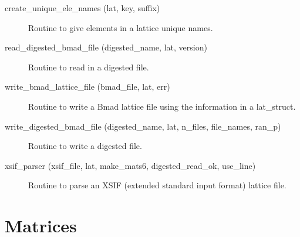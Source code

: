 \begin{description}
\label{r:create.unique.ele.names}
\item[create_unique_ele_names (lat, key, suffix)] \Newline 
Routine to give elements in a lattice unique names.

\label{r:read.digested.bmad.file}
\item[read_digested_bmad_file (digested_name, lat, version)] \Newline
Routine to read in a digested file. 

\label{r:write.bmad.lattice.file}
\item[write_bmad_lattice_file (bmad_file, lat, err)] \Newline 
Routine to write a Bmad lattice file using the information in
a lat_struct.

\label{r:write.digested.bmad.file}
\item[write_digested_bmad_file (digested_name, lat, n_files, file_names, ran_p)] \Newline
Routine to write a digested file. 

\label{r:xsif.parser}
\item[xsif_parser (xsif_file, lat, make_mats6, digested_read_ok, use_line)] \Newline 
     Routine to parse an XSIF (extended standard input format) lattice file.

\end{description}

\section{Matrices}
\label{r:mat}

